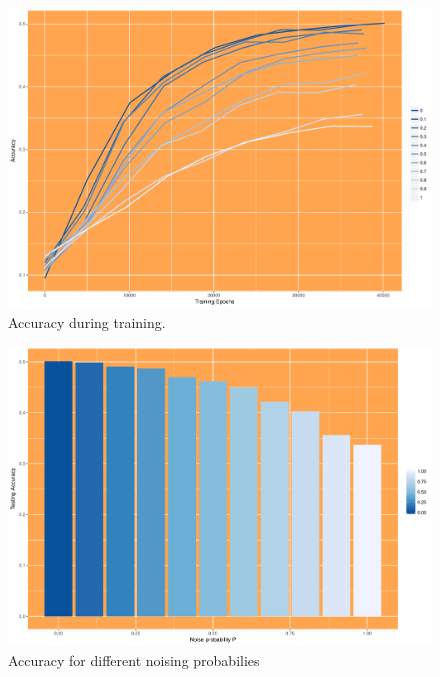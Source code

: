 \documentclass[conference]{IEEEtran}
\begin{document}
\begin{figure}[H]
\centering
   \includegraphics[width=\linewidth]{accOverEpochs.pdf}
  \caption{Accuracy during training.}
  \label{fig:accOverEpochs}
\end{figure}
\begin{figure}[H]
\centering
   \includegraphics[width=\linewidth]{accOverNoiseP.pdf}
  \caption{Accuracy for different noising probabilies}
  \label{fig:accOverNoiseP}
\end{figure}
\end{document}
